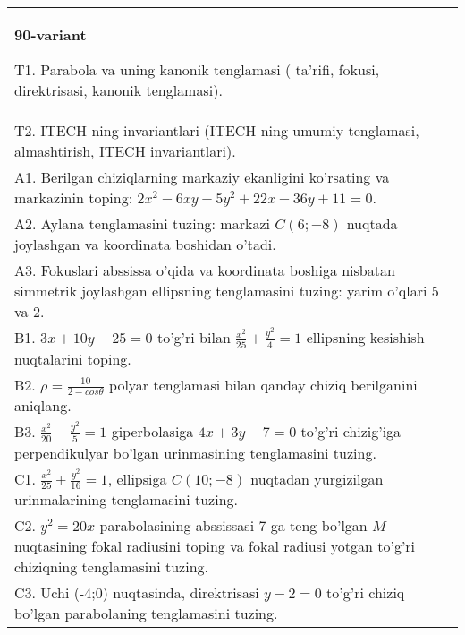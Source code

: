 \documentclass{article}
\begin{document}
\begin{tabular}{m{17cm}}
\textbf{90-variant}
\newline

T1. Parabola va uning kanonik tenglamasi ( ta'rifi, fokusi, direktrisasi, kanonik tenglamasi).\\

T2. ITECH-ning invariantlari (ITECH-ning umumiy tenglamasi, almashtirish, ITECH invariantlari).\\

A1. Berilgan chiziqlarning markaziy ekanligini ko'rsating va markazinin toping: $2x^{2}-6xy+5y^{2}+22x-36y+11=0$.\\

A2. Aylana tenglamasini tuzing: markazi $C(6;-8)$ nuqtada joylashgan va koordinata boshidan o'tadi.\\

A3. Fokuslari abssissa o'qida va koordinata boshiga nisbatan simmetrik joylashgan ellipsning tenglamasini tuzing: yarim o'qlari 5 va 2.\\

B1. $3x + 10y - 25 = 0$ to'g'ri bilan $\frac{x^{2}}{25} + \frac{y^{2}}{4} = 1$ ellipsning kesishish nuqtalarini toping.  \\

B2. $\rho = \frac{10}{2 - cos\theta}$ polyar tenglamasi bilan qanday chiziq berilganini aniqlang.  \\

B3. $\frac{x^{2}}{20} - \frac{y^{2}}{5} = 1$ giperbolasiga $4x + 3y - 7 = 0$ to'g'ri chizig'iga perpendikulyar bo'lgan urinmasining tenglamasini tuzing.  \\

C1. $\frac{x^{2}}{25} + \frac{y^{2}}{16} = 1$, ellipsiga $C(10; - 8)$ nuqtadan yurgizilgan urinmalarining tenglamasini tuzing.  \\

C2. $y^{2} = 20x$ parabolasining abssissasi 7 ga teng bo'lgan $M$ nuqtasining fokal radiusini toping va fokal radiusi yotgan to'g'ri chiziqning tenglamasini tuzing.  \\

C3. Uchi (-4;0) nuqtasinda, direktrisasi $y - 2 = 0$ to'g'ri chiziq bo'lgan parabolaning tenglamasini tuzing.\\

\end{tabular}
\vspace{1cm}
\end{document}
